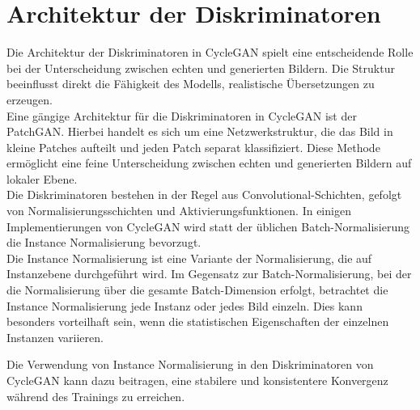 \section*{Architektur der Diskriminatoren}
Die Architektur der Diskriminatoren in CycleGAN spielt eine entscheidende Rolle bei der Unterscheidung zwischen echten und generierten Bildern. Die Struktur beeinflusst direkt die Fähigkeit des Modells, realistische Übersetzungen zu erzeugen.
\\
Eine gängige Architektur für die Diskriminatoren in CycleGAN ist der PatchGAN. Hierbei handelt es sich um eine Netzwerkstruktur, die das Bild in kleine Patches aufteilt und jeden Patch separat klassifiziert. Diese Methode ermöglicht eine feine Unterscheidung zwischen echten und generierten Bildern auf lokaler Ebene.
\\
Die Diskriminatoren bestehen in der Regel aus Convolutional-Schichten, gefolgt von Normalisierungsschichten und Aktivierungsfunktionen. In einigen Implementierungen von CycleGAN wird statt der üblichen Batch-Normalisierung die Instance Normalisierung bevorzugt.
\\
Die Instance Normalisierung ist eine Variante der Normalisierung, die auf Instanzebene durchgeführt wird. Im Gegensatz zur Batch-Normalisierung, bei der die Normalisierung über die gesamte Batch-Dimension erfolgt, betrachtet die Instance Normalisierung jede Instanz oder jedes Bild einzeln. Dies kann besonders vorteilhaft sein, wenn die statistischen Eigenschaften der einzelnen Instanzen variieren.

Die Verwendung von Instance Normalisierung in den Diskriminatoren von CycleGAN kann dazu beitragen, eine stabilere und konsistentere Konvergenz während des Trainings zu erreichen. 